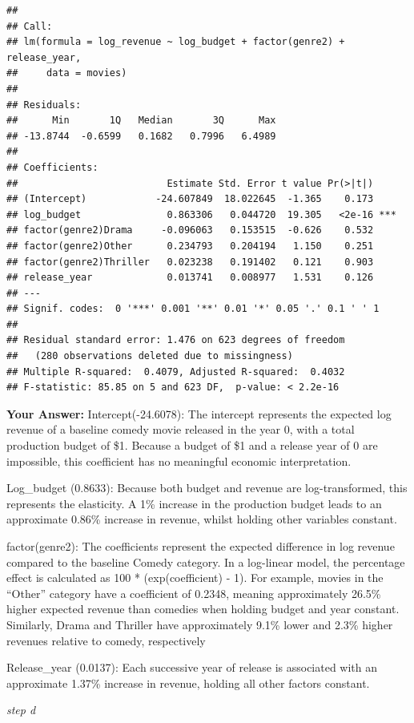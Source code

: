 \documentclass[
]{article}
\begin{document}
\begin{verbatim}
## 
## Call:
## lm(formula = log_revenue ~ log_budget + factor(genre2) + release_year, 
##     data = movies)
## 
## Residuals:
##      Min       1Q   Median       3Q      Max 
## -13.8744  -0.6599   0.1682   0.7996   6.4989 
## 
## Coefficients:
##                          Estimate Std. Error t value Pr(>|t|)    
## (Intercept)            -24.607849  18.022645  -1.365    0.173    
## log_budget               0.863306   0.044720  19.305   <2e-16 ***
## factor(genre2)Drama     -0.096063   0.153515  -0.626    0.532    
## factor(genre2)Other      0.234793   0.204194   1.150    0.251    
## factor(genre2)Thriller   0.023238   0.191402   0.121    0.903    
## release_year             0.013741   0.008977   1.531    0.126    
## ---
## Signif. codes:  0 '***' 0.001 '**' 0.01 '*' 0.05 '.' 0.1 ' ' 1
## 
## Residual standard error: 1.476 on 623 degrees of freedom
##   (280 observations deleted due to missingness)
## Multiple R-squared:  0.4079, Adjusted R-squared:  0.4032 
## F-statistic: 85.85 on 5 and 623 DF,  p-value: < 2.2e-16
\end{verbatim}

\textbf{Your Answer:} Intercept(-24.6078): The intercept represents the
expected log revenue of a baseline comedy movie released in the year 0,
with a total production budget of \$1. Because a budget of \$1 and a
release year of 0 are impossible, this coefficient has no meaningful
economic interpretation.

Log\_budget (0.8633): Because both budget and revenue are
log-transformed, this represents the elasticity. A 1\% increase in the
production budget leads to an approximate 0.86\% increase in revenue,
whilst holding other variables constant.

factor(genre2): The coefficients represent the expected difference in
log revenue compared to the baseline Comedy category. In a log-linear
model, the percentage effect is calculated as 100 * (exp(coefficient) -
1). For example, movies in the ``Other'' category have a coefficient of
0.2348, meaning approximately 26.5\% higher expected revenue than
comedies when holding budget and year constant. Similarly, Drama and
Thriller have approximately 9.1\% lower and 2.3\% higher revenues
relative to comedy, respectively

Release\_year (0.0137): Each successive year of release is associated
with an approximate 1.37\% increase in revenue, holding all other
factors constant.

\emph{step d}
\end{document}
